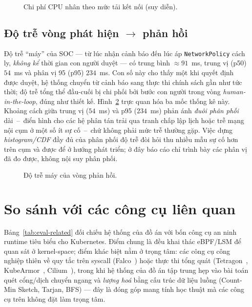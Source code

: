 \begin{figure}[H]
  \centering
  \resizebox{0.82\linewidth}{!}{}
  \caption{Chi phí CPU nhân theo mức tải kết nối (suy diễn).}
  \label{fig:overhead-load}
\end{figure}

\subsection{Độ trễ vòng phát hiện $\rightarrow$ phản hồi}
\label{sec:eval-latency}

Độ trễ ``máy'' của SOC --- từ lúc nhận cảnh báo đến lúc áp \texttt{NetworkPolicy}
cách ly, \emph{không kể} thời gian con người duyệt --- có trung bình
$\approx 91$~ms, trung vị (p50) $54$~ms và phân vị 95 (p95) $234$~ms. Con số này
cho thấy một khi quyết định được duyệt, hệ thống chuyển từ cảnh báo sang thực thi
chính sách gần như tức thời; độ trễ tổng thể đầu-cuối bị chi phối bởi bước con
người trong vòng \emph{human-in-the-loop}, đúng như thiết kế.
Hình~\ref{fig:latency-pct} trực quan hóa ba mốc thống kê này. Khoảng cách giữa trung
vị ($54$~ms) và p95 ($234$~ms) phản ánh \emph{đuôi phân phối} dài~--~điển hình cho các
hệ phân tán trải qua tranh chấp lập lịch hoặc trễ mạng nội cụm ở một số ít sự cố~--~chứ
không phải mức trễ thường gặp. Việc dựng \emph{histogram/CDF} đầy đủ của phân phối độ
trễ đòi hỏi thu nhiều mẫu sự cố hơn trên cụm và được để ở hướng phát triển; ở đây báo
cáo chỉ trình bày các phân vị đã đo được, không nội suy phân phối.

\begin{figure}[H]
  \centering
  \resizebox{0.62\linewidth}{!}{}
  \caption{Độ trễ máy của vòng phản hồi.}
  \label{fig:latency-pct}
\end{figure}

\section{So sánh với các công cụ liên quan}
\label{sec:eval-related}

Bảng~\ref{tab:eval-related} đối chiếu hệ thống của đồ án với bốn công cụ an ninh
runtime tiêu biểu cho Kubernetes. Điểm chung là đều khai thác eBPF/LSM để quan sát
ở kernel-space; điểm khác biệt nằm ở trọng tâm: các công cụ công nghiệp thiên về
quy tắc trên syscall (Falco~\cite{falco2024}) hoặc thực thi tổng quát
(Tetragon~\cite{tetragon2024}, KubeArmor~\cite{kubearmor2024},
Cilium~\cite{cilium2024}), trong khi hệ thống của đồ án tập trung hẹp vào bài toán
quét cổng/dịch chuyển ngang và \emph{lượng hoá} bằng cấu trúc dữ liệu luồng
(Count-Min Sketch, Tarjan, BFS) --- đây là đóng góp mang tính học thuật mà các
công cụ trên không đặt làm trọng tâm.

